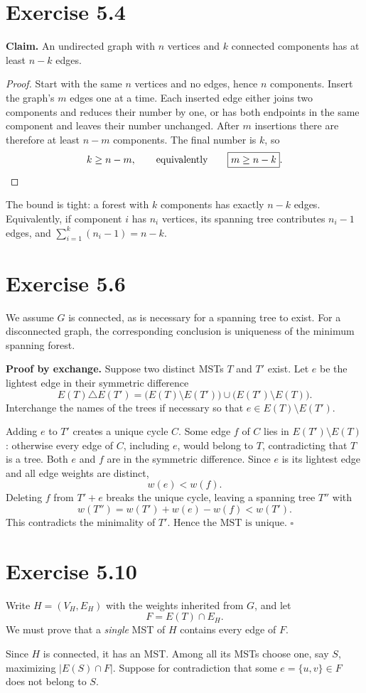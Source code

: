 \documentclass[11pt]{article}
\newcommand{\exercise}[1]{\Needspace{6\baselineskip}\section*{Exercise #1}}
\begin{document}
\exercise{5.4}

\textbf{Claim.} An undirected graph with $n$ vertices and $k$ connected
components has at least $n-k$ edges.

\begin{proof}
Start with the same $n$ vertices and no edges, hence $n$ components.
Insert the graph's $m$ edges one at a time. Each inserted edge either
joins two components and reduces their number by one, or has both
endpoints in the same component and leaves their number unchanged.
After $m$ insertions there are therefore at least $n-m$ components.
The final number is $k$, so
\[
  k\ge n-m,\qquad\text{equivalently}\qquad \boxed{m\ge n-k}.\qedhere
\]
\end{proof}

The bound is tight: a forest with $k$ components has exactly $n-k$
edges. Equivalently, if component $i$ has $n_i$ vertices, its spanning
tree contributes $n_i-1$ edges, and
$\sum_{i=1}^k(n_i-1)=n-k$.

\exercise{5.6}

We assume $G$ is connected, as is necessary for a spanning tree to exist.
For a disconnected graph, the corresponding conclusion is uniqueness
of the minimum spanning forest.

\textbf{Proof by exchange.}
Suppose two distinct MSTs $T$ and $T'$ exist. Let $e$ be the lightest
edge in their symmetric difference
\[
  E(T)\triangle E(T')
   =\bigl(E(T)\setminus E(T')\bigr)
     \cup\bigl(E(T')\setminus E(T)\bigr).
\]
Interchange the names of the trees if necessary so that
$e\in E(T)\setminus E(T')$.

Adding $e$ to $T'$ creates a unique cycle $C$.
Some edge $f$ of $C$ lies in $E(T')\setminus E(T)$: otherwise every edge
of $C$, including $e$, would belong to $T$, contradicting that $T$ is a tree.
Both $e$ and $f$ are in the symmetric difference. Since $e$ is its
lightest edge and all edge weights are distinct,
\[
  w(e)<w(f).
\]
Deleting $f$ from $T'+e$ breaks the unique cycle, leaving a spanning tree
$T''$ with
\[
  w(T'')=w(T')+w(e)-w(f)<w(T').
\]
This contradicts the minimality of $T'$. Hence
$\boxed{\text{the MST is unique.}}$ \hfill$\square$

\clearpage
\exercise{5.10}

Write $H=(V_H,E_H)$ with the weights inherited from $G$, and let
\[
  F=E(T)\cap E_H.
\]
We must prove that a \emph{single} MST of $H$ contains every edge of $F$.

Since $H$ is connected, it has an MST. Among all its MSTs choose one,
say $S$, maximizing $|E(S)\cap F|$. Suppose for contradiction that
some $e=\{u,v\}\in F$ does not belong to $S$.
\end{document}
